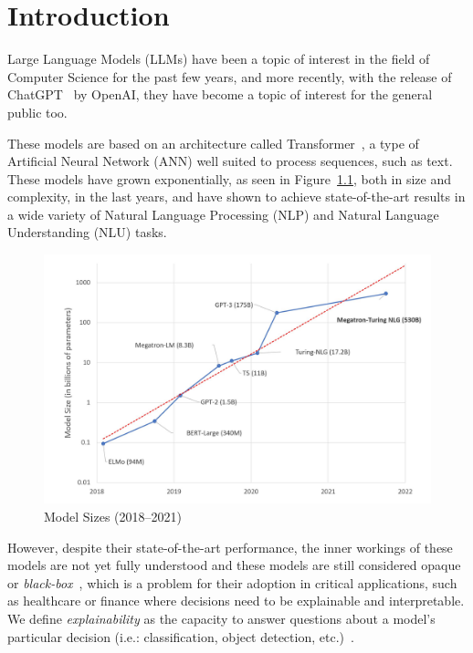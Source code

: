 \chapter{Introduction}

Large Language Models (LLMs) have been a topic of interest in the field of Computer Science for the past few years, and more recently, with the release of ChatGPT~\cite{chatgpt} by OpenAI, they have become a topic of interest for the general public too.

These models are based on an architecture called Transformer~\cite{attention_is_all_you_need}, a type of Artificial Neural Network (ANN)
well suited to process sequences, such as text. These models have grown exponentially, as seen in Figure~\ref{fig:model_sizes}, both in size and complexity, in the last years, and
have shown to achieve state-of-the-art results in a wide variety of Natural Language Processing (NLP) and Natural Language Understanding (NLU) tasks.

\begin{figure}[H]
    \centering
    \includegraphics[width=\textwidth]{figs/model_sizes}
    \caption{Model Sizes (2018--2021)~\cite{model_sizes}}
    \label{fig:model_sizes}
\end{figure}

However, despite their state-of-the-art performance, the inner workings of these models are not yet fully understood and these models are still considered opaque or \emph{black-box}~\cite{lei-etal-2016-rationalizing}, which is a problem for their adoption in critical applications, such as healthcare or finance where decisions need to be explainable and interpretable. We define \emph{explainability} as the capacity to answer questions about a model's particular decision (i.e.: classification, object detection, etc.)~\cite{explainable-ai}.

